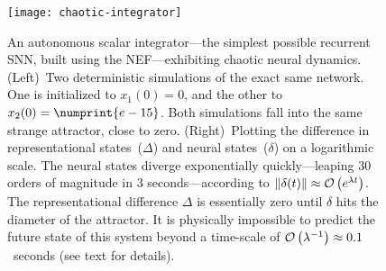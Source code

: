 \begin{figure}
    \centering
    \texttt{[image: chaotic-integrator]}
     
    \caption{\label{fig:chaotic-integrator} 
      An autonomous scalar integrator---the simplest possible recurrent SNN, built using the NEF---exhibiting chaotic neural dynamics.
      (Left)~Two deterministic simulations of the exact same network.
          One is initialized to $x_1(0) = 0$, and the other to $x_2(0) = \numprint{e-15}$.
          Both simulations fall into the same strange attractor, close to zero.
      (Right)~Plotting the difference in representational states~($\Delta$) and neural states~($\delta$) on a logarithmic scale.
          The neural states diverge exponentially quickly---leaping 30 orders of magnitude in 3 seconds---according to $\| \delta(t) \| \approx \mathcal{O}\left({e^{\lambda t}}\right)$.
          The representational difference $\Delta$ is essentially zero until $\delta$ hits the diameter of the attractor.
          It is physically impossible to predict the future state of this system beyond a time-scale of $\mathcal{O}\left({\lambda^{-1}}\right) \approx 0.1$~seconds (see text for details).
    }
\end{figure}

